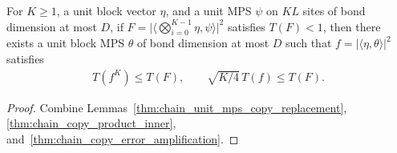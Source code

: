 \begin{lemma}
    \label{thm:chain_mps_copy_error_amplification}
    \leanok
    For $K\ge1$, a unit block vector $\eta$, and a unit MPS $\psi$ on $KL$ sites
    of bond dimension at most $D$, if
    $F=\bigl|\bigl\langle\bigotimes_{i=0}^{K-1}\eta,\psi\bigr\rangle\bigr|^2$
    satisfies $T(F)<1$, then there exists a unit block MPS $\theta$ of bond
    dimension at most $D$ such that $f=|\langle\eta,\theta\rangle|^2$ satisfies
    \begin{align}
        \label{eq:chain_mps_copy_error_amplification}
        T(f^K)\le T(F),\qquad \sqrt{K/4}\,T(f)\le T(F).
    \end{align}
\end{lemma}
\begin{proof}\leanok
    Combine Lemmas~\ref{thm:chain_unit_mps_copy_replacement},
    \ref{thm:chain_copy_product_inner}, and~\ref{thm:chain_copy_error_amplification}.
\end{proof}
